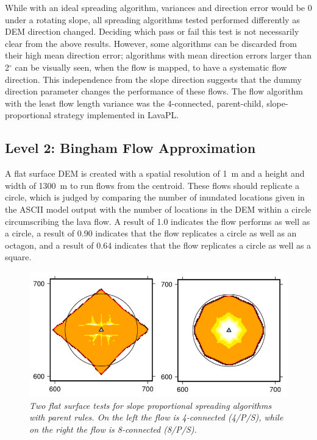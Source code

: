 \documentclass[12pt,letter]{article}
\begin{document}
		While with an ideal spreading algorithm, variances and direction error would be 0 under a rotating slope, all spreading algorithms tested performed differently as DEM direction changed. Deciding which pass or fail this test is not necessarily clear from the above results. However, some algorithms can be discarded from their high mean direction error; algorithms with mean direction errors larger than 2$^{\circ}$ can be visually seen, when the flow is mapped, to have a systematic flow direction. This independence from the slope direction suggests that the dummy direction parameter changes the performance of these flows. The flow algorithm with the least flow length variance was the 4-connected, parent-child, slope-proportional strategy implemented in LavaPL.

	\subsection{Level 2: Bingham Flow Approximation}
		
		A flat surface DEM is created with a spatial resolution of 1~m and a height and width of 1300~m to run flows from the centroid. These flows should replicate a circle, which is judged by comparing the number of inundated locations given in the ASCII model output with the number of locations in the DEM within a circle circumscribing the lava flow. A result of 1.0 indicates the flow performs as well as a circle, a result of 0.90 indicates that the flow replicates a circle as well as an octagon, and a result of 0.64 indicates that the flow replicates a circle as well as a square.
		
		\begin{figure}[!h]
		\centering
		\includegraphics[width=0.7\linewidth]{figures/pancake}
		\caption{\textit{Two flat surface tests for slope proportional spreading algorithms with parent rules. On the left the flow is 4-connected (4/P/S), while on the right the flow is 8-connected (8/P/S).}}
		\label{fig:pancake}
	\end{figure}
	
\end{document}
